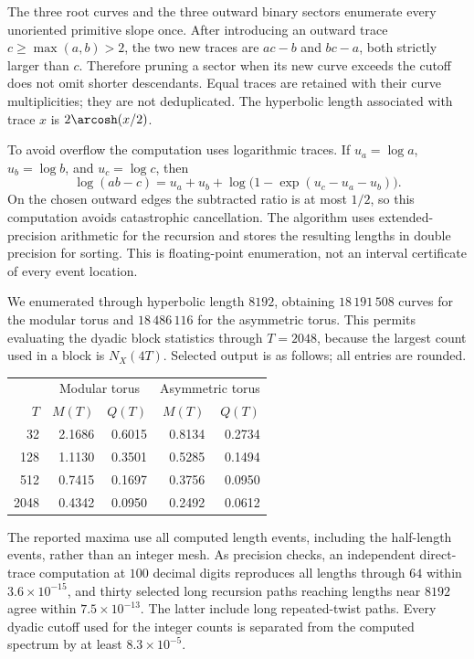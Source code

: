 The three root curves and the three outward binary sectors enumerate
every unoriented primitive slope once. After introducing an outward
trace $c\ge\max(a,b)>2$, the two new traces are $ac-b$ and $bc-a$,
both strictly larger than $c$. Therefore pruning a sector when its new
curve exceeds the cutoff does not omit shorter descendants. Equal traces
are retained with their curve multiplicities; they are not deduplicated.
The hyperbolic length associated with trace $x$ is $2\arcosh(x/2)$.

To avoid overflow the computation uses logarithmic traces. If
$u_a=\log a$, $u_b=\log b$, and $u_c=\log c$, then
\[
 \log(ab-c)=u_a+u_b+
        \log\bigl(1-\exp(u_c-u_a-u_b)\bigr).
\]
On the chosen outward edges the subtracted ratio is at most $1/2$,
so this computation avoids catastrophic cancellation. The algorithm
uses extended-precision arithmetic for the recursion and stores the
resulting lengths in double precision for sorting. This is floating-point
enumeration, not an interval certificate of every event location.

We enumerated through hyperbolic length $8192$, obtaining
$18\,191\,508$ curves for the modular torus and $18\,486\,116$ for
the asymmetric torus. This permits evaluating the dyadic block statistics
through $T=2048$, because the largest count used in a block is $N_X(4T)$.
Selected output is as follows; all entries are rounded.

\begin{center}
\begin{tabular}{r r r r r}
\toprule
&\multicolumn{2}{c}{Modular torus}&\multicolumn{2}{c}{Asymmetric torus}\\
$T$&$M(T)$&$Q(T)$&$M(T)$&$Q(T)$\\
\midrule
32 & 2.1686 & 0.6015 & 0.8134 & 0.2734 \\
128 & 1.1130 & 0.3501 & 0.5285 & 0.1494 \\
512 & 0.7415 & 0.1697 & 0.3756 & 0.0950 \\
2048 & 0.4342 & 0.0950 & 0.2492 & 0.0612 \\
\bottomrule
\end{tabular}
\end{center}

The reported maxima use all computed length events, including the
half-length events, rather than an integer mesh. As precision checks,
an independent direct-trace computation at $100$ decimal digits reproduces
all lengths through $64$ within $3.6\times10^{-15}$, and thirty
selected long recursion paths reaching lengths near $8192$ agree within
$7.5\times10^{-13}$. The latter include long repeated-twist paths.
Every dyadic cutoff used for the integer counts is separated from the
computed spectrum by at least $8.3\times10^{-5}$.

